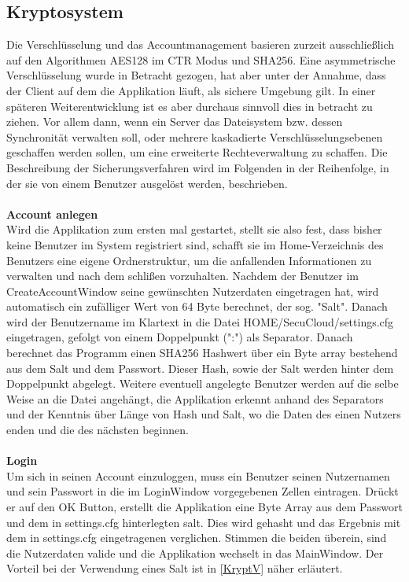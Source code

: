 \documentclass[12pt,a4paper,bibliography=totocnumbered,listof=totocnumbered]{scrartcl}
\begin{document}
\subsection{Kryptosystem}
Die Verschlüsselung und das Accountmanagement basieren zurzeit ausschließlich auf den Algorithmen AES128 im CTR Modus und SHA256. Eine asymmetrische Verschlüsselung wurde in Betracht gezogen, hat aber unter der Annahme, dass der Client auf dem die Applikation läuft, als sichere Umgebung gilt. In einer späteren Weiterentwicklung ist es aber durchaus sinnvoll dies in betracht zu ziehen. Vor allem dann, wenn ein Server das Dateisystem bzw. dessen Synchronität verwalten soll, oder mehrere kaskadierte Verschlüsselungsebenen geschaffen werden sollen, um eine erweiterte Rechteverwaltung zu schaffen. Die Beschreibung der Sicherungsverfahren wird im Folgenden in der Reihenfolge, in der sie von einem Benutzer ausgelöst werden, beschrieben.
\\\\\textbf{Account anlegen}\\
Wird die Applikation zum ersten mal gestartet, stellt sie also fest, dass bisher keine Benutzer im System registriert sind, schafft sie im Home-Verzeichnis des Benutzers eine eigene Ordnerstruktur, um die anfallenden Informationen zu verwalten und nach dem schlißen vorzuhalten. Nachdem der Benutzer im CreateAccountWindow seine gewünschten Nutzerdaten eingetragen hat, wird automatisch ein zufälliger Wert von 64 Byte berechnet, der sog. "Salt". Danach wird der Benutzername im Klartext in die Datei HOME/SecuCloud/settings.cfg eingetragen, gefolgt von einem Doppelpunkt (":") als Separator. Danach berechnet das Programm einen SHA256 Hashwert über ein Byte array bestehend aus dem Salt und dem Passwort. Dieser Hash, sowie der Salt werden hinter dem Doppelpunkt abgelegt. Weitere eventuell angelegte Benutzer werden auf die selbe Weise an die Datei angehängt, die Applikation erkennt anhand des Separators und der Kenntnis über Länge von Hash und Salt, wo die Daten des einen Nutzers enden und die des nächsten beginnen.
\\\\\textbf{Login}\\
Um sich in seinen Account einzuloggen, muss ein Benutzer seinen Nutzernamen und sein Passwort in die im LoginWindow vorgegebenen Zellen eintragen. Drückt er auf den OK Button, erstellt die Applikation eine Byte Array aus dem Passwort und dem in settings.cfg hinterlegten salt. Dies wird gehasht und das Ergebnis mit dem in settings.cfg eingetragenen verglichen. Stimmen die beiden überein, sind die Nutzerdaten valide und die Applikation wechselt in das MainWindow. Der Vorteil bei der Verwendung eines Salt ist in \ref{KryptV} näher erläutert.
\end{document}
